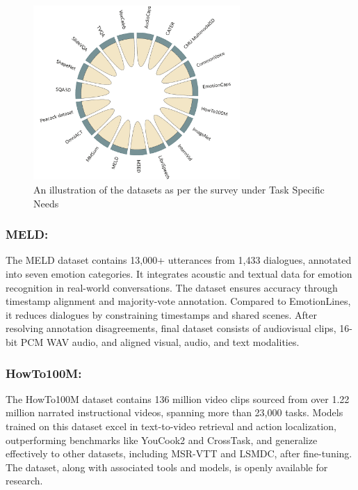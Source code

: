 \documentclass[runningheads]{llncs}
\begin{document}
\begin{figure}[t!]
    \centering
    \includegraphics[width=0.7\textwidth]{task_specific.png} %
    \caption{An illustration of the datasets as per the survey under Task Specific Needs}
    \label{fig:fig_task}
    \vspace{-1em}
\end{figure}

\subsubsection{MELD:}

The MELD dataset \cite{ref39} contains 13,000+ utterances from 1,433 dialogues, annotated into seven emotion categories. It integrates acoustic and textual data for emotion recognition in real-world conversations. The dataset ensures accuracy through timestamp alignment and majority-vote annotation. Compared to EmotionLines, it reduces dialogues by constraining timestamps and shared scenes. After resolving annotation disagreements, final dataset consists of audiovisual clips, 16-bit PCM WAV audio, and aligned visual, audio, and text modalities.



\subsubsection{HowTo100M:}
The HowTo100M dataset \cite{ref80} contains 136 million video clips sourced from over 1.22 million narrated instructional videos, spanning more than 23,000 tasks. Models trained on this dataset excel in text-to-video retrieval and action localization, outperforming benchmarks like YouCook2 and CrossTask, and generalize effectively to other datasets, including MSR-VTT and LSMDC, after fine-tuning. The dataset, along with associated tools and models, is openly available for research.
\end{document}
